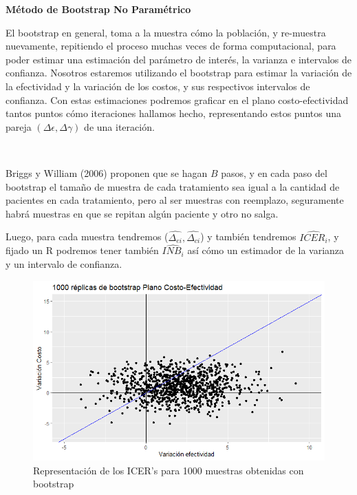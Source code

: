 \documentclass{article}
\begin{document}
\begin{center}
    \textbf{Método de Bootstrap No Paramétrico}
\end{center}

El bootstrap en general, toma a la muestra cómo la población, y re-muestra nuevamente, repitiendo el proceso muchas veces de forma computacional, para poder estimar una estimación del parámetro de interés, la varianza e intervalos de confianza.
Nosotros estaremos utilizando el bootstrap para estimar la variación de la efectividad y la variación de los costos, y sus respectivos intervalos de confianza.
Con estas estimaciones podremos graficar en el plano costo-efectividad tantos puntos cómo iteraciones hallamos hecho, representando estos puntos una pareja $(\Delta\epsilon,\Delta\gamma)$ de una iteración.

\

Briggs y William (2006) proponen que se hagan $B$ pasos, y en cada paso del bootstrap el tamaño de muestra de cada tratamiento sea igual a la cantidad de pacientes en cada tratamiento, pero al ser muestras con reemplazo, seguramente habrá muestras en que se repitan algún paciente y otro no salga.

Luego, para cada muestra tendremos ($\hat{\Delta_{ei}},\hat{\Delta_{ci}}$) y también tendremos $\widehat{ICER_{i}}$, y fijado un R podremos tener también $\widehat{INB_i}$ así cómo un estimador de la varianza y un intervalo de confianza.

\begin{figure}[htbp]
    \centering
    \includegraphics[width=1\textwidth]{grafi/boostrap.jpg}
    \caption{Representación de los ICER's para 1000 muestras obtenidas con bootstrap}
    \label{fig:3}
\end{figure}
\end{document}
